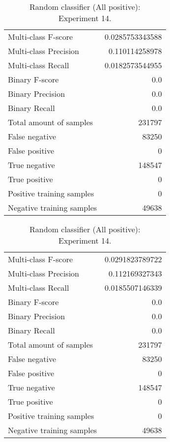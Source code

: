 \begin{table}[H]
\begin{minipage}{0.5\textwidth}
\caption{Random classifier (All positive): \\Experiment 13.}
\centering
\begin{tabular}{l r}
\toprule
Multi-class F-score & 0.0285753343588 \\
Multi-class Precision & 0.110114258978 \\
Multi-class Recall & 0.0182573544955 \\
\midrule
Binary F-score & 0.0 \\
Binary Precision & 0.0 \\
Binary Recall & 0.0 \\
\midrule
Total amount of samples & 231797 \\
False negative & 83250 \\
False positive & 0 \\
True negative & 148547 \\
True positive & 0 \\
\midrule
Positive training samples & 0 \\
Negative training samples & 49638 \\
\bottomrule
\end{tabular}
\end{minipage}
\hfillx
\begin{minipage}{0.5\textwidth}
\caption{Random classifier (All positive): \\Experiment 14.}
\centering
\begin{tabular}{l r}
\toprule
Multi-class F-score & 0.0291823789722 \\
Multi-class Precision & 0.112169327343 \\
Multi-class Recall & 0.0185507146339 \\
\midrule
Binary F-score & 0.0 \\
Binary Precision & 0.0 \\
Binary Recall & 0.0 \\
\midrule
Total amount of samples & 231797 \\
False negative & 83250 \\
False positive & 0 \\
True negative & 148547 \\
True positive & 0 \\
\midrule
Positive training samples & 0 \\
Negative training samples & 49638 \\
\bottomrule
\end{tabular}
\end{minipage}
\end{table}
